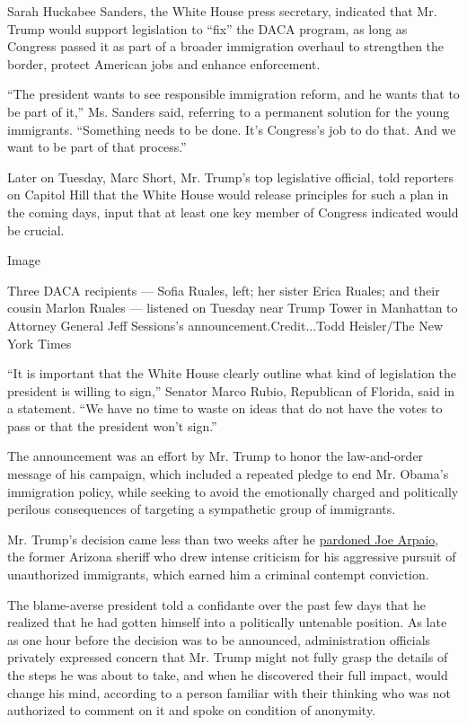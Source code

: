 Sarah Huckabee Sanders, the White House press secretary, indicated that
Mr. Trump would support legislation to ``fix'' the DACA program, as long
as Congress passed it as part of a broader immigration overhaul to
strengthen the border, protect American jobs and enhance enforcement.

``The president wants to see responsible immigration reform, and he
wants that to be part of it,'' Ms. Sanders said, referring to a
permanent solution for the young immigrants. ``Something needs to be
done. It's Congress's job to do that. And we want to be part of that
process.''

Later on Tuesday, Marc Short, Mr. Trump's top legislative official, told
reporters on Capitol Hill that the White House would release principles
for such a plan in the coming days, input that at least one key member
of Congress indicated would be crucial.

Image

Three DACA recipients --- Sofia Ruales, left; her sister Erica Ruales;
and their cousin Marlon Ruales --- listened on Tuesday near Trump Tower
in Manhattan to Attorney General Jeff Sessions's
announcement.Credit...Todd Heisler/The New York Times

``It is important that the White House clearly outline what kind of
legislation the president is willing to sign,'' Senator Marco Rubio,
Republican of Florida, said in a statement. ``We have no time to waste
on ideas that do not have the votes to pass or that the president won't
sign.''

The announcement was an effort by Mr. Trump to honor the law-and-order
message of his campaign, which included a repeated pledge to end Mr.
Obama's immigration policy, while seeking to avoid the emotionally
charged and politically perilous consequences of targeting a sympathetic
group of immigrants.

Mr. Trump's decision came less than two weeks after he
\href{https://www.nytimes3xbfgragh.onion/2017/08/25/us/politics/joe-arpaio-trump-pardon-sheriff-arizona.html}{pardoned
Joe Arpaio}, the former Arizona sheriff who drew intense criticism for
his aggressive pursuit of unauthorized immigrants, which earned him a
criminal contempt conviction.

The blame-averse president told a confidante over the past few days that
he realized that he had gotten himself into a politically untenable
position. As late as one hour before the decision was to be announced,
administration officials privately expressed concern that Mr. Trump
might not fully grasp the details of the steps he was about to take, and
when he discovered their full impact, would change his mind, according
to a person familiar with their thinking who was not authorized to
comment on it and spoke on condition of anonymity.

